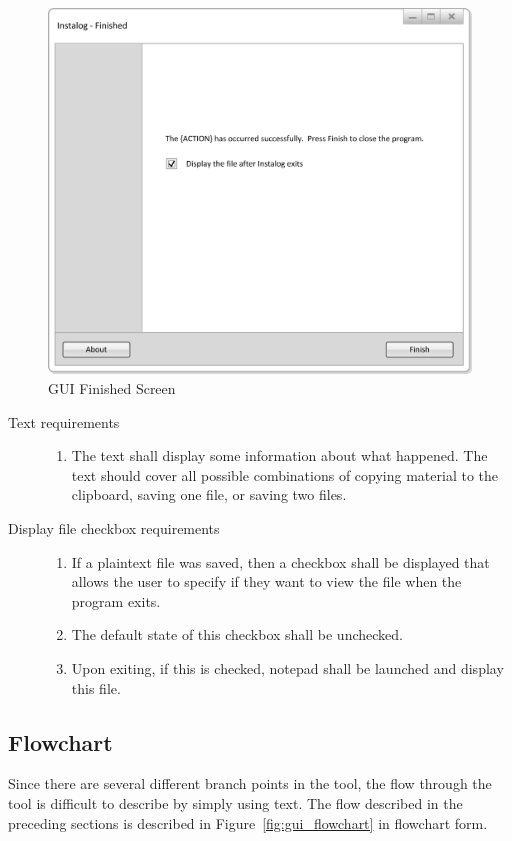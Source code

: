 \begin{figure}[!ht]
  	\centering
	\includegraphics{figures/gui/Finished.png}
  	\caption{GUI Finished Screen}
  	\label{fig:gui_finished}
\end{figure}

\begin{description}
\item[Text requirements] \hfill
\begin{enumerate}
  \item The text shall display some information about what happened.  The text
  should cover all possible combinations of copying material to the clipboard,
  saving one file, or saving two files.
\end{enumerate}
\item[Display file checkbox requirements] \hfill
\begin{enumerate}
  \item If a plaintext file was saved, then a checkbox shall be displayed that
  allows the user to specify if they want to view the file when the program
  exits.
  \item The default state of this checkbox shall be unchecked.
  \item Upon exiting, if this is checked, notepad shall be launched and display
  this file.
\end{enumerate}
\end{description}

\subsection{Flowchart}
Since there are several different branch points in the tool, the flow through
the tool is difficult to describe by simply using text.  The flow described in
the preceding sections is described in Figure~\ref{fig:gui_flowchart} in
flowchart form.

